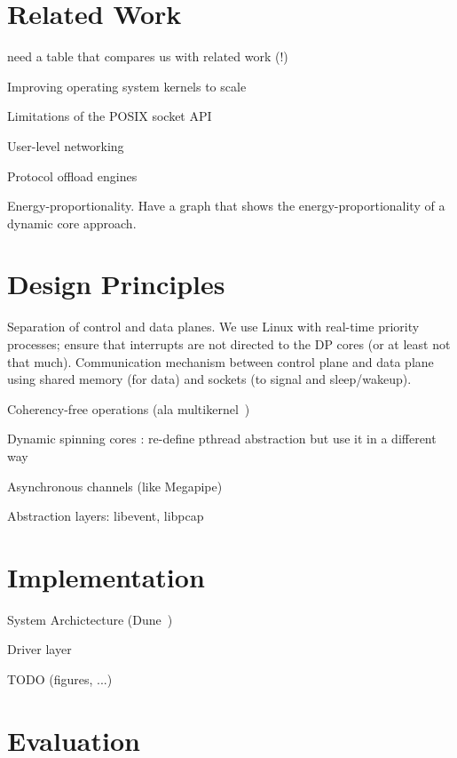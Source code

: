 


\section{Related Work}

\todo need a table that compares us with related work (!)

\todo Improving operating system kernels to scale

\todo Limitations of the POSIX socket API

\todo User-level networking

\todo Protocol offload engines

\todo Energy-proportionality.   Have a graph that shows the energy-proportionality of a dynamic core approach.


\section{Design Principles}



\todo Separation of control and data planes.  We use Linux with
real-time priority processes; ensure that interrupts are not directed
to the DP cores (or at least not that much).  Communication mechanism
between control plane and data plane using shared memory (for data)
and sockets (to signal and sleep/wakeup).


\todo Coherency-free operations  (ala multikernel~\cite{DBLP:conf/sosp/BaumannBDHIPRSS09})

\todo Dynamic spinning cores : re-define pthread abstraction but use it in a different way

\todo Asynchronous channels (like Megapipe)

\todo Abstraction layers: libevent, libpcap


\section{Implementation}




\todo System Archictecture (Dune~\cite{belay2012dune})

\todo Driver layer

\todo TODO (figures, ...)

\section{Evaluation}



